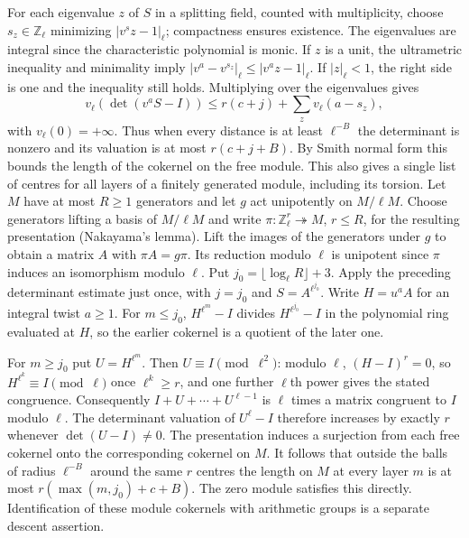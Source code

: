 \documentclass[11pt]{amsart}
\theoremstyle{definition}
\theoremstyle{remark}
\begin{document}
For each eigenvalue $z$ of $S$ in a splitting field, counted with
multiplicity, choose $s_z\in\mathbb Z_\ell$ minimizing
$|v^s z-1|_\ell$; compactness ensures existence. The eigenvalues
are integral since the characteristic polynomial is monic. If $z$
is a unit, the ultrametric inequality and minimality imply
$|v^a-v^{s_z}|_\ell\le |v^a z-1|_\ell$. If $|z|_\ell<1$,
the right side is one and the inequality still holds. Multiplying
over the eigenvalues gives
\[
 v_\ell(\det(v^a S-I))\le r(c+j)+\sum_z v_\ell(a-s_z),
\]
with $v_\ell(0)=+\infty$. Thus when every distance is at least
$\ell^{-B}$ the determinant is nonzero and its valuation is at most
$r(c+j+B)$. By Smith normal form this bounds the length of the
cokernel on the free module. This also gives a single list of centres for all layers of a
finitely generated module, including its torsion. Let $M$ have at most
$R\ge1$ generators and let $g$ act unipotently on $M/\ell M$.
Choose generators lifting a basis of $M/\ell M$ and write
$\pi:\mathbb Z_\ell^r\twoheadrightarrow M$, $r\le R$, for the
resulting presentation (Nakayama's lemma). Lift the images of the
generators under $g$ to obtain a matrix $A$ with $\pi A=g\pi$.
Its reduction modulo $\ell$ is unipotent since $\pi$ induces an
isomorphism modulo $\ell$. Put $j_0=\lfloor\log_\ell R\rfloor+3$.
Apply the preceding determinant estimate just once, with $j=j_0$ and
$S=A^{\ell^{j_0}}$. Write $H=u^a A$ for an integral twist $a\ge1$.
For $m\le j_0$, $H^{\ell^m}-I$ divides $H^{\ell^{j_0}}-I$ in
the polynomial ring evaluated at $H$, so the earlier cokernel is a
quotient of the later one.

For $m\ge j_0$ put $U=H^{\ell^m}$. Then $U\equiv I\pmod{\ell^2}$:
modulo $\ell$, $(H-I)^r=0$, so $H^{\ell^k}\equiv I\pmod\ell$
once $\ell^k\ge r$, and one further $\ell$th power gives the stated
congruence. Consequently $I+U+\cdots+U^{\ell-1}$ is $\ell$ times
a matrix congruent to $I$ modulo $\ell$. The determinant valuation
of $U^\ell-I$ therefore increases by exactly $r$ whenever
$\det(U-I)\ne0$. The presentation induces a surjection from each
free cokernel onto the corresponding cokernel on $M$. It follows
that outside the balls of radius $\ell^{-B}$ around the same $r$
centres the length on $M$ at every layer $m$ is at most
$r(\max(m,j_0)+c+B)$. The zero module satisfies this directly.
Identification of these module cokernels with arithmetic groups is
a separate descent assertion.
\end{document}
